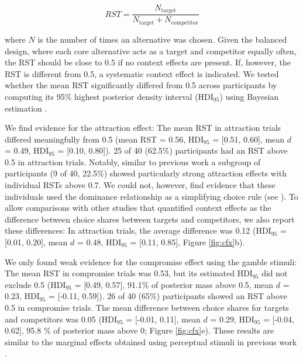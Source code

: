 \documentclass[11pt, a4paper]{article}
\begin{document}
\begin{equation}
    RST = \frac{N_{\text{target}}}{N_{\text{target}} + N_{\text{competitor}}}
\end{equation}

where $N$ is the number of times an alternative was chosen. Given the balanced design, where each core alternative acts as a target and competitor equally often, the RST should be close to 0.5 if no context effects are present. If, however, the RST is different from 0.5, a systematic context effect is indicated. We tested whether the mean RST significantly differed from 0.5 across participants by computing its 95\% highest posterior density interval (HDI$_{95}$) using Bayesian estimation \parencite[BEST;][]{kruschke2013BayesianEstimationSupersedes,kruschke2014DoingBayesianData}. 

We find evidence for the attraction effect: The mean RST in attraction trials differed meaningfully from 0.5 (mean RST = 0.56, HDI$_{95}$ = [0.51, 0.60], mean $d$ = 0.49, HDI$_{95}$ = [0.10, 0.80]). 25 of 40 (62.5\%) participants had an RST above 0.5 in attraction trials. Notably, similar to previous work \parencite[e.g.,][]{trueblood2012MultialternativeContextEffects} a subgroup of participants (9 of 40, 22.5\%) showed particularly strong attraction effects with individual RSTs above 0.7. We could not, however, find evidence that these individuals used the dominance relationship as a simplifying choice rule (see ). To allow comparisons with other studies that quantified context effects as the difference between choice shares between targets and competitors, we also report these differences: In attraction trials, the average difference was 0.12 (HDI$_{95}$ = [0.01, 0.20], mean $d$ = 0.48, HDI$_{95}$ = [0.11, 0.85], Figure \ref{fig:cfx}b). 

We only found weak evidence for the compromise effect using the gamble stimuli: The mean RST in compromise trials was 0.53, but its estimated HDI$_{95}$ did not exclude 0.5 (HDI$_{95}$ = [0.49, 0.57], 91.1\% of posterior mass above 0.5, mean $d$ = 0.23, HDI$_{95}$ = [-0.11, 0.59]). 26 of 40 (65\%) participants showed an RST above 0.5 in compromise trials. The mean difference between choice shares for targets and competitors was 0.05 (HDI$_{95}$ = [-0.01, 0.11], mean $d$ = 0.29, HDI$_{95}$ = [-0.04, 0.62], 95.8 \% of posterior mass above 0; Figure \ref{fig:cfx}e). These results are similar to the marginal effects obtained using perceptual stimuli in previous work \parencite{trueblood2015FragileNatureContextual,trueblood2013NotJustConsumers}. 
\end{document}
